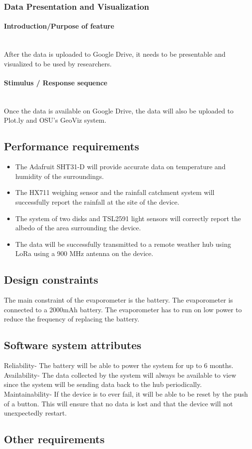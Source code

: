 \documentclass[onecolumn, draftclsnofoot,10pt, compsoc]{IEEEtran}
\newcommand{\subsubsubsection}[1]{\paragraph{#1}\mbox{}\\}
\begin{document}
\subsubsection{Data Presentation and Visualization}
\subsubsubsection{Introduction/Purpose of feature}
After the data is uploaded to Google Drive, it needs to be presentable and visualized to be used by researchers.
\subsubsubsection{Stimulus / Response sequence}
Once the data is available on Google Drive, the data will also be uploaded to Plot.ly and OSU’s GeoViz system.
\subsection{Performance requirements}
\begin{itemize}

\item The Adafruit SHT31-D will provide accurate data on temperature and humidity of the surroundings.
\item The HX711 weighing sensor and the rainfall catchment system will successfully report the rainfall at the site of the device.
\item The system of two disks and TSL2591 light sensors will correctly report the albedo of the area surrounding the device.
\item The data will be successfully transmitted to a remote weather hub using LoRa using a 900 MHz antenna on the device.
\end{itemize}
\subsection{Design constraints}
The main constraint of the evaporometer is the battery. The evaporometer is connected to a 2000mAh battery. The evaporometer has to run on low power to reduce the frequency of replacing the battery.
\subsection{Software system attributes}
Reliability- The battery will be able to power the system for up to 6 months.
Availability- The data collected by the system will always be available to view since the system will be sending data back to the hub periodically.
Maintainability- If the device is to ever fail, it will be able to be reset by the push of a button. This will ensure that no data is lost and that the device will not unexpectedly restart.
\subsection{Other requirements}
\end{document}
